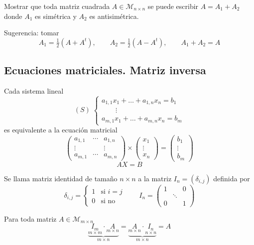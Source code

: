 \documentclass[11pt,a4paper]{article}
\newcommand{\M}{\mathcal{M}}
\begin{document}
\begin{ejercicio}
Mostrar que toda matriz cuadrada $A\in\M_{n\times n}$ se puede escribir $A=A_1+A_2$ donde $A_1$ es simétrica y $A_2$ es antisimétrica.

Sugerencia: tomar
\[
A_1=\tfrac12(A+A^t),\qquad A_2=\tfrac12(A-A^t),\qquad A_1+A_2=A
\]
\end{ejercicio}

\subsection{Ecuaciones matriciales. Matriz inversa}

\begin{proposicion}
Cada sistema lineal
\[
(S)\;\begin{cases}
a_{1,1}x_1+\dots+a_{1,n}x_n=b_1\\
\qquad\vdots\\
a_{m,1}x_1+\dots+a_{m,n}x_n=b_m
\end{cases}
\]
es equivalente a la ecuación matricial
\[
\begin{pmatrix}a_{1,1}&\cdots&a_{1,n}\\\vdots&&\vdots\\a_{m,1}&\cdots&a_{m,n}\end{pmatrix}
\times
\begin{pmatrix}x_1\\\vdots\\x_n\end{pmatrix}
=
\begin{pmatrix}b_1\\\vdots\\b_m\end{pmatrix}
\]
\[
AX=B
\]
\end{proposicion}

\begin{definicion}
Se llama matriz identidad de tamaño $n\times n$ a la matriz $I_n=(\delta_{i,j})$ definida por
\[
\delta_{i,j}=\begin{cases}1 & \text{si } i=j\\ 0 & \text{si no}\end{cases}
\qquad
I_n=\begin{pmatrix}1&&0\\&\ddots&\\0&&1\end{pmatrix}
\]
\end{definicion}

\begin{proposicion}
Para toda matriz $A\in\M_{m\times n}$
\[
\underbrace{\underset{m\times m}{I_m}\cdot\underset{m\times n}{A}}_{m\times n}
=\underbrace{\underset{m\times n}{A}\cdot\underset{n\times n}{I_n}}_{m\times n}=A
\]
\end{proposicion}
\end{document}

